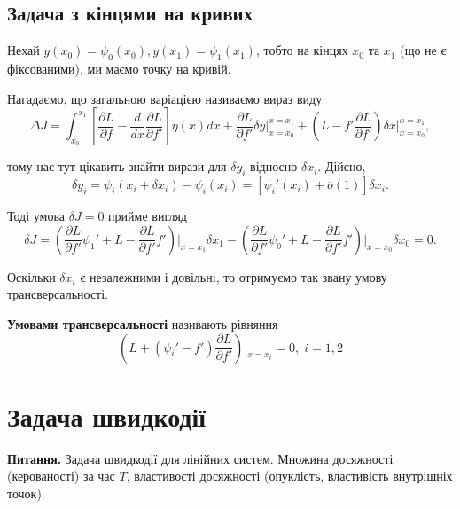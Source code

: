 \documentclass[14pt]{extarticle}
\newcommand{\<}{\langle}
\renewcommand{\>}{\rangle}
\theoremstyle{mystyle}{\newtheorem{definition}{Definition}[section]}
\theoremstyle{mystyle}{\newtheorem{proposition}[definition]{Proposition}}
\theoremstyle{mystyle}{\newtheorem{theorem}[definition]{Theorem}}
\theoremstyle{mystyle}{\newtheorem{lemma}[definition]{Lemma}}
\theoremstyle{mystyle}{\newtheorem{corollary}[definition]{Corollary}}
\theoremstyle{mystyle}{\newtheorem*{remark}{Remark}}
\theoremstyle{mystyle}{\newtheorem*{remarks}{Remarks}}
\theoremstyle{mystyle}{\newtheorem*{example}{Example}}
\theoremstyle{mystyle}{\newtheorem*{examples}{Examples}}
\theoremstyle{definition}{\newtheorem*{exercise}{Exercise}}
\theoremstyle{cstyle}{\newtheorem*{cthm}{}}
\theoremstyle{warn}
\begin{document}
\subsection{Задача з кінцями на кривих}

Нехай $y(x_0)=\psi_0(x_0), y(x_1)=\psi_1(x_1)$, тобто на кінцях $x_0$ та $x_1$ (що не є фіксованими), ми маємо точку на кривій.

Нагадаємо, що загальною варіацією називаємо вираз виду
\begin{equation}
    \Delta J = \int_{x_0}^{x_1}\left[\frac{\partial L}{\partial f}-\frac{d}{dx}\frac{\partial L}{\partial f'}\right]\eta(x)dx + \frac{\partial L}{\partial f'}\delta y\Big|_{x=x_0}^{x=x_1} +
    \left(L-f'\frac{\partial L}{\partial f'}\right)\delta x \Big|_{x=x_0}^{x=x_1},
\end{equation}

тому нас тут цікавить знайти вирази для $\delta y_i$ відносно $\delta x_i$. Дійсно,
\begin{equation}
    \delta y_i = \psi_i(x_i+\delta x_i) - \psi_i(x_i) = [\psi_i'(x_i)+\overline{o}(1)]\delta x_i.
\end{equation}

Тоді умова $\delta J=0$ прийме вигляд
\begin{equation}
    \delta J = \left(\frac{\partial L}{\partial f'}\psi_1' + L - \frac{\partial L}{\partial f'}f'\right)\Big|_{x=x_1}\delta x_1 - \left(\frac{\partial L}{\partial f'}\psi_0' + L - \frac{\partial L}{\partial f'}f'\right)\Big|_{x=x_0}\delta x_0 = 0.
\end{equation}

Оскільки $\delta x_i$ є незалежними і довільні, то отримуємо так звану умову трансверсальності.
\begin{definition}
\textbf{Умовами трансверсальності} називають рівняння
\begin{equation}
    \left(L+(\psi_i'-f')\frac{\partial L}{\partial f'}\right)\Big|_{x=x_i} = 0, \; i=1,2  
\end{equation}
\end{definition}

\pagebreak

\section{Задача швидкодії}

\textbf{Питання.} Задача швидкодії для лінійних систем. Множина досяжності (керованості) за час $T$, властивості досяжності (опуклість, властивість внутрішніх точок).
\end{document}
